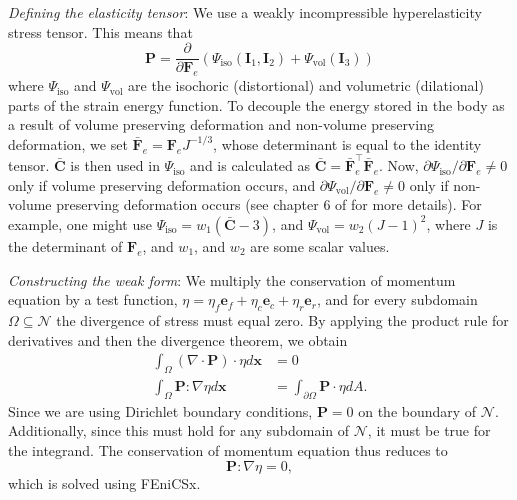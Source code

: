 \emph{Defining the elasticity tensor}: We use a weakly incompressible hyperelasticity stress tensor. This means that
\begin{equation*}
    \mathbf{P} = \frac{\partial }{\partial \mathbf{F}_e}(\Psi_\text{iso}(\mathbf{I}_1, \mathbf{I}_2) + \Psi_\text{vol}(\mathbf{I}_3))
\end{equation*}
where $\Psi_\text{iso}$ and $\Psi_\text{vol}$ are the isochoric (distortional) and volumetric (dilational) parts of the strain energy function. To decouple the energy stored in the body as a result of volume preserving deformation and non-volume preserving deformation, we set $\mathbf{\bar{F}}_e = \mathbf{F}_eJ^{-1/3}$, whose determinant is equal to the identity tensor. $\mathbf{\bar{C}}$ is then used in $\Psi_\text{iso}$ and is calculated as $\mathbf{\bar{C}} = \mathbf{\bar{F}}_e^\top \mathbf{\bar{F}}_e$. Now, $\partial\Psi_\text{iso}/\partial \mathbf{F}_e \neq 0$ only if volume preserving deformation occurs, and $\partial\Psi_\text{vol}/\partial \mathbf{F}_e \neq 0$ only if non-volume preserving deformation occurs (see chapter 6 of \cite{Holzapfel2002} for more details). For example, one might use $\Psi_\text{iso} = w_1\left(\mathbf{\bar{C}} - 3\right)$, and $\Psi_\text{vol} = w_2(J-1)^2$, where $J$ is the determinant of $\mathbf{F}_e$, and $w_1$, and $w_2$ are some scalar values. \par
\emph{Constructing the weak form}: We multiply the conservation of momentum equation by a test function, $\eta =  \eta_f\mathbf{e}_f + \eta_c\mathbf{e}_c + \eta_r\mathbf{e}_r$, and for every subdomain $\Omega \subseteq \mathcal{N}$ the divergence of stress must equal zero. By applying the product rule for derivatives and then the divergence theorem, we obtain
\begin{align*}
    \int_\Omega(\nabla\cdot\mathbf{P})\cdot\eta d\mathbf{x} &= 0 \\
    \int_\Omega \mathbf{P} : \nabla\eta d\mathbf{x} &= \int_{\partial\Omega}\mathbf{P}\cdot\eta dA.
\end{align*}
Since we are using Dirichlet boundary conditions, $\mathbf{P} = 0$ on the boundary of $\mathcal{N}$. Additionally, since this must hold for any subdomain of $\mathcal{N}$, it must be true for the integrand. The conservation of momentum equation thus reduces to
\begin{equation}
\label{conservation of momentum}
    \mathbf{P} : \nabla\eta = 0,
\end{equation}
which is solved using FEniCSx.
\par
